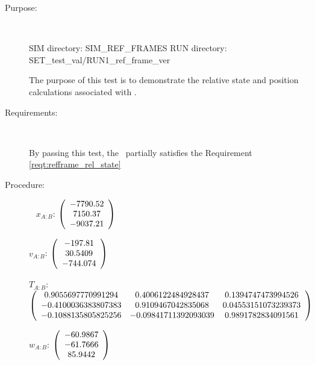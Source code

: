 \label{test:refframe_test_4}
\begin{description}
\item[Purpose:] \ \newline

SIM directory: SIM\_REF\_FRAMES
RUN directory: SET\_test\_val/RUN1\_ref\_frame\_ver

The purpose of this test is to demonstrate the relative state and
position calculations associated with .

\item[Requirements:] \ \newline

By passing this test, the \ partially satisfies
the Requirement \ref{reqt:refframe_rel_state}

\item[Procedure:] \ \newline
$x_{A:B}$:  $\left( \begin{array} {ccc} -7790.52 \\    7150.37 \\   -9037.21
\end{array} \right)\\ \\$

$v_{A:B}$:   $\left( \begin{array} {ccc}  -197.81 \\    30.5409 \\   -744.074
\end{array} \right)\\ \\$

$T_{A:B}$:   $\left( \begin{array} {ccc}
0.9055697770991294 & 0.4006122484928437 & 0.1394747473994526 \\
 -0.4100036383807383 & 0.9109467042835068 & 0.04553151073239373 \\
  -0.1088135805825256 & -0.09841711392093039 & 0.9891782834091561
\end{array} \right)\\ \\$

$w_{A:B}$:   $\left( \begin{array} {ccc}  -60.9867 \\   -61.7666 \\    85.9442
\end{array} \right)\\ \\$


\end{description}
